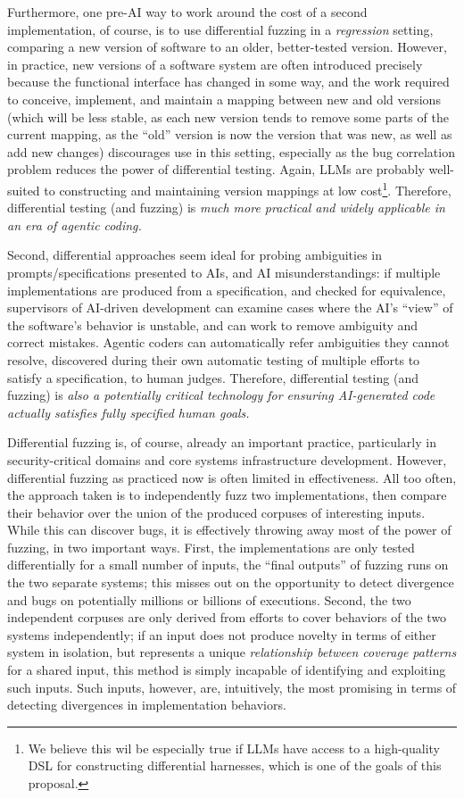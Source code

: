 Furthermore, one pre-AI way to work around the cost of a second implementation, of
course, is to use differential fuzzing in a \emph{regression} setting,
comparing a new version of software to an older, better-tested
version.  However, in practice, new versions of a software system are often introduced precisely
because the functional interface has changed in some way, and the work
required to conceive, implement, and maintain a mapping between new
and old versions (which will be less stable, as each new version tends to
remove some parts of the current mapping, as the ``old'' version is
now the version that was new, as well as add new changes) discourages
use in this setting, especially as the bug correlation problem reduces
the power of differential testing.  Again, LLMs are probably
well-suited to constructing and maintaining version mappings at low
cost\footnote{We believe this wil be especially true if LLMs have
  access to a high-quality DSL for constructing differential
  harnesses, which is one of the goals of this proposal.}.  Therefore,
differential testing (and fuzzing) is \emph{much more practical and
  widely applicable in an era of agentic coding.}

Second, differential approaches seem ideal for probing ambiguities in
prompts/specifications presented to AIs, and AI misunderstandings: if
multiple implementations are produced from a specification, and
checked for equivalence, supervisors of AI-driven development can
examine cases where the AI's ``view'' of the software's behavior is
unstable, and can work to remove ambiguity and correct mistakes.
Agentic coders can automatically refer ambiguities they cannot
resolve, discovered during their own automatic testing of multiple
efforts to satisfy a specification, to human judges.  Therefore,
differential testing (and fuzzing) is \emph{also a potentially
  critical technology for ensuring AI-generated code actually
  satisfies fully specified human goals.}

Differential fuzzing is, of course, already an important practice,
particularly in security-critical domains and core systems infrastructure development.  However,
differential fuzzing as practiced now is often limited in
effectiveness.  All too often, the approach taken is to independently
fuzz two implementations, then compare their behavior over the union
of the produced corpuses of interesting inputs.  While this can
discover bugs, it is effectively throwing away most of the power of
fuzzing, in two important ways.  First, the implementations are only
tested differentially for a small number of inputs, the ``final outputs''
of fuzzing runs on the two separate systems; this misses out on the
opportunity to detect divergence and bugs on potentially millions or
billions of executions.  Second, the two independent corpuses are only
derived from efforts to cover behaviors of the two systems
independently; if an input does not produce novelty in terms of either system
in isolation, but represents a unique \emph{relationship between coverage patterns} for a
shared input, this method is simply incapable of identifying and
exploiting such inputs.  Such inputs, however, are, intuitively, the
most promising in terms of detecting divergences in implementation behaviors.

